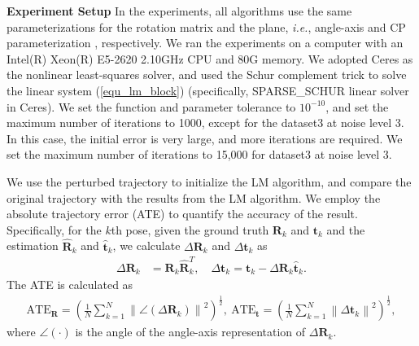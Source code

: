 \documentclass{vgtc}                          %
\begin{document}
\textbf{Experiment Setup} \quad In the experiments, all  algorithms use the same parameterizations for the  rotation matrix and the plane, \textit{i.e.}, angle-axis and CP  parameterization \cite{geneva2018lips}, respectively. We ran the experiments on a computer with an Intel(R) Xeon(R)  E5-2620 2.10GHz CPU and 80G memory. We adopted Ceres \cite{ceres-solver} as the nonlinear least-squares solver, and  used the  Schur complement trick \cite{triggs1999bundle} to solve the linear system (\ref{equ_lm_block}) (specifically, SPARSE\_SCHUR linear solver in Ceres).  We set the function  and parameter tolerance to $10^{-10}$, and set the maximum number of iterations to 1000, except for the dataset3 at noise level 3. In this case, the initial error is very large, and more iterations are required. We set the maximum number of iterations to 15,000 for dataset3 at noise level 3.  

We use the perturbed trajectory to initialize the LM algorithm, and compare the original trajectory with the results from the LM algorithm. We employ the absolute trajectory error (ATE) \cite{zhang2018tutorial} to quantify the accuracy of the result. Specifically, for the $k$th pose, given the ground truth $\mathbf{R}_k$  and $\mathbf{t}_k$ and  the estimation $\hat{\mathbf{R}}_k$  and $\hat{\mathbf{t}}_k$, we calculate  $\Delta\mathbf{R}_k$ and $\Delta\mathbf{t}_k$ as
\begin{equation}
\begin{split}
\Delta\mathbf{R}_k  & = \mathbf{R}_k\hat{\mathbf{R}}_k^{T},  \quad
\Delta\mathbf{t}_k   =  \mathbf{t}_k -  \Delta\mathbf{R}_k \hat{\mathbf{t}}_k.
\end{split}
\end{equation}
The ATE is calculated as
\begin{equation}
\begin{split}
\text{ATE}_{\mathbf{R}}  = \left( \frac{1}{N}\sum_{k=1}^{N}\left\| \angle\left( \Delta\mathbf{R}_k \right) \right\|^{2}\right) ^{\frac{1}{2}},  \
\text{ATE}_{\mathbf{t}}  = \left( \frac{1}{N}\sum_{k=1}^{N}\left\| \Delta\mathbf{t}_k  \right\|^{2}\right) ^{\frac{1}{2}},
\end{split}
\end{equation}
where $\angle\left( \cdot\right) $ is the angle of the angle-axis representation of  $\Delta\mathbf{R}_k$.

\end{document}
